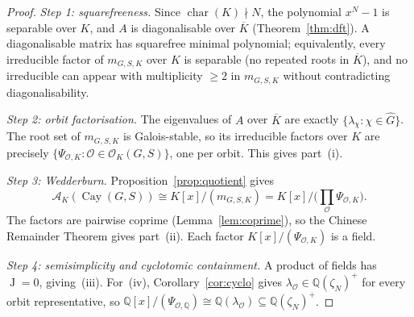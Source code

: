 \documentclass[10pt,a4paper]{amsart}
\DeclareMathOperator{\Cay}{Cay}
\newcommand{\Ghat}{\widehat{G}}
\DeclareMathOperator{\Jac}{J}
\newcommand{\Q}{\mathbb{Q}}
\newcommand{\calA}{\mathcal{A}}
\newcommand{\calO}{\mathcal{O}}
\DeclareMathOperator{\ch}{char}
\begin{document}
\begin{proof}
\emph{Step 1: squarefreeness.}  Since $\ch(K) \nmid N$, the polynomial
$x^N - 1$ is separable over $K$, and $A$ is diagonalisable over
$\overline{K}$ (Theorem~\ref{thm:dft}).  A diagonalisable matrix has
squarefree minimal polynomial; equivalently, every irreducible factor of
$m_{G,S,K}$ over $K$ is separable (no repeated roots in $\overline{K}$),
and no irreducible can appear with multiplicity $\ge 2$ in $m_{G,S,K}$
without contradicting diagonalisability.

\emph{Step 2: orbit factorisation.}  The eigenvalues of $A$ over
$\overline{K}$ are exactly $\{\lambda_\chi : \chi \in \Ghat\}$.  The root
set of $m_{G,S,K}$ is Galois-stable, so its irreducible factors over $K$
are precisely $\{\Psi_{\calO,K} : \calO \in \calO_K(G,S)\}$, one per orbit.
This gives part~(i).

\emph{Step 3: Wedderburn.}  Proposition~\ref{prop:quotient} gives
\[
\calA_K(\Cay(G,S)) \cong K[x]/(m_{G,S,K})
= K[x]/\!\bigl(\prod_\calO \Psi_{\calO,K}\bigr).
\]
The factors are pairwise coprime
(Lemma~\ref{lem:coprime}), so the Chinese Remainder Theorem gives part~(ii).
Each factor $K[x]/(\Psi_{\calO,K})$ is a field.

\emph{Step 4: semisimplicity and cyclotomic containment.}  A product of
fields has $\Jac = 0$, giving~(iii).  For~(iv), Corollary~\ref{cor:cyclo}
gives $\lambda_\calO \in \Q(\zeta_N)^+$ for every orbit representative, so
$\Q[x]/(\Psi_{\calO,\Q}) \cong \Q(\lambda_\calO) \subseteq \Q(\zeta_N)^+$.
\end{proof}
\end{document}

